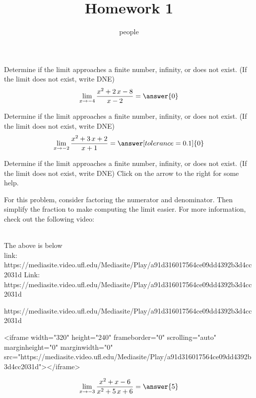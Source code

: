 \documentclass[•]{ximera}
\title{Homework 1}
\author{people}
\begin{document}
\maketitle


\begin{problem}
Determine if the limit approaches a finite number, infinity, or does not exist. (If the limit does not exist, write DNE)
\[\lim_{x\to{{-4}}}\dfrac{{{x^{2} + 2 \, x - 8}}}{{{x - 2}}}=\answer{0}\]
\end{problem}%




\begin{problem}
Determine if the limit approaches a finite number, infinity, or does not exist. (If the limit does not exist, write DNE)
\[\lim_{x\to{{-2}}}\dfrac{{{x^{2} + 3 \, x + 2}}}{{{x + 1}}}=\answer[tolerance=0.1]{0}\]
\end{problem}%



\begin{problem}
Determine if the limit approaches a finite number, infinity, or does not exist. (If the limit does not exist, write DNE)  Click on the arrow to the right for some help.
\begin{expandable}
For this problem, consider factoring the numerator and denominator.  Then simplify the fraction to make computing the limit easier.  For more information, check out the following video:
\begin{expandable}
\\
The above is below\\
link: https://mediasite.video.ufl.edu/Mediasite/Play/a91d316017564ce09dd4392b3d4cc2031d
Link: https://mediasite.video.ufl.edu/Mediasite/Play/a91d316017564ce09dd4392b3d4cc2031d
\begin{html}
https://mediasite.video.ufl.edu/Mediasite/Play/a91d316017564ce09dd4392b3d4cc2031d
\end{html}
\begin{html}
<iframe width="320" height="240" frameborder="0" scrolling="auto" marginheight="0" marginwidth="0" src="https://mediasite.video.ufl.edu/Mediasite/Play/a91d316017564ce09dd4392b3d4cc2031d"></iframe>
\end{html}
\end{expandable}
\end{expandable}


\[\lim_{x\to{{-3}}}\dfrac{{{x^{2} + x - 6}}}{{{x^{2} + 5 \, x + 6}}}=\answer{{{5}}}\]
\end{problem}%
\end{document}
